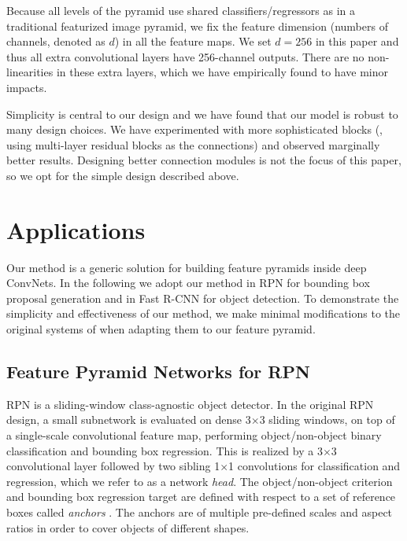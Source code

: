 \documentclass[10pt,twocolumn,letterpaper]{article}
\begin{document}
Because all levels of the pyramid use shared classifiers/regressors as in a traditional featurized image pyramid, we fix the feature dimension (numbers of channels, denoted as $d$) in all the feature maps.
We set $d=256$ in this paper and thus all extra convolutional layers have 256-channel outputs.
There are no non-linearities in these extra layers, which we have empirically found to have minor impacts.

Simplicity is central to our design and we have found that our model is robust to many design choices.
We have experimented with more sophisticated blocks (\eg, using multi-layer residual blocks \cite{He2016} as the connections) and observed marginally better results.
Designing better connection modules is not the focus of this paper, so we opt for the simple design described above. 

\section{Applications}

Our method is a generic solution for building feature pyramids inside deep ConvNets.
In the following we adopt our method in RPN \cite{Ren2015a} for bounding box proposal generation and in Fast R-CNN \cite{Girshick2015a} for object detection.
To demonstrate the simplicity and effectiveness of our method, we make minimal modifications to the original systems of \cite{Ren2015a,Girshick2015a} when adapting them to our feature pyramid.

\subsection{Feature Pyramid Networks for RPN}

RPN \cite{Ren2015a} is a sliding-window class-agnostic object detector.
In the original RPN design, a small subnetwork is evaluated on dense 3$\times$3 sliding windows, on top of a single-scale convolutional feature map, performing object/non-object binary classification and bounding box regression.
This is realized by a 3$\times$3 convolutional layer followed by two sibling 1$\times$1 convolutions for classification and regression, which we refer to as a network \emph{head}.
The object/non-object criterion and bounding box regression target are defined with respect to a set of reference boxes called \emph{anchors} \cite{Ren2015a}.
The anchors are of multiple pre-defined scales and aspect ratios in order to cover objects of different shapes.
\end{document}
